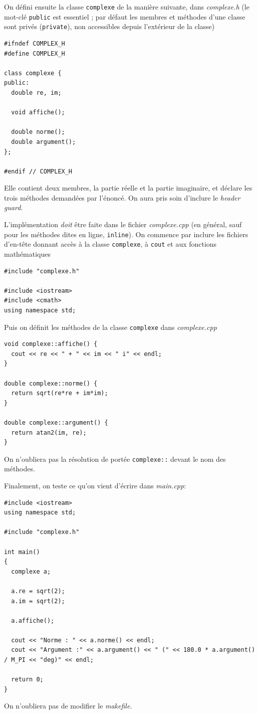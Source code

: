 \documentclass{book}
\newcommand{\inline}[1]{\texttt{#1}}
\def\filename{\emph}
\begin{document}
\begin{correction}

On défini ensuite la classe \inline{complexe} de la manière suivante, dans \filename{complexe.h} (le mot-clé \inline{public} est essentiel ; par défaut les membres et méthodes d'une classe sont privés (\inline{private}), non accessibles depuis l'extérieur de la classe)
\begin{verbatim}
#ifndef COMPLEX_H
#define COMPLEX_H

class complexe {
public:
  double re, im;

  void affiche();

  double norme();
  double argument();
};

#endif // COMPLEX_H
\end{verbatim}
Elle contient deux membres, la partie réelle et la partie imaginaire, et déclare les trois méthodes demandées par l'énoncé. On aura pris soin d'inclure le \emph{header guard}.

L'implémentation \emph{doit} être faite dans le fichier \filename{complexe.cpp} (en général, sauf pour les méthodes dites en ligne, \inline{inline}). On commence par inclure les fichiers d'en-tête donnant accès à la classe \inline{complexe}, à \inline{cout} et aux fonctions mathématiques
\begin{verbatim}
#include "complexe.h"

#include <iostream>
#include <cmath>
using namespace std;
\end{verbatim}
Puis on définit les méthodes de la classe \inline{complexe} dans \filename{complexe.cpp}
\begin{verbatim}
void complexe::affiche() {
  cout << re << " + " << im << " i" << endl;
}

double complexe::norme() {
  return sqrt(re*re + im*im);
}

double complexe::argument() {
  return atan2(im, re);
}
\end{verbatim}
On n'oubliera pas la résolution de portée \inline{complexe::} devant le nom des méthodes.

Finalement, on teste ce qu'on vient d'écrire dans \filename{main.cpp}:
\begin{verbatim}
#include <iostream>
using namespace std;

#include "complexe.h"

int main()
{
  complexe a;

  a.re = sqrt(2);
  a.im = sqrt(2);

  a.affiche();

  cout << "Norme : " << a.norme() << endl;
  cout << "Argument :" << a.argument() << " (" << 180.0 * a.argument() / M_PI << "deg)" << endl;

  return 0;
}
\end{verbatim}

On n'oubliera pas de modifier le \filename{makefile}.

\end{correction}
\end{document}
